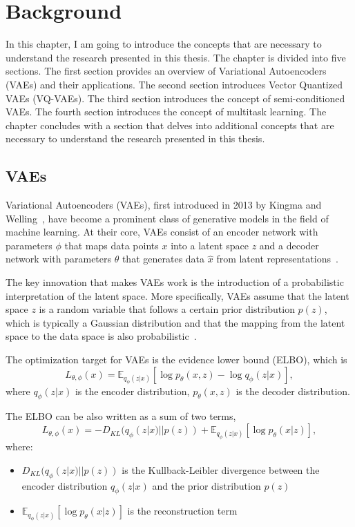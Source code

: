 \chapter{Background}

In this chapter, I am going to introduce the concepts that are necessary to understand the research presented in this thesis. The chapter is divided into five sections. The first section provides an overview of Variational Autoencoders (VAEs) and their applications. The second section introduces Vector Quantized VAEs (VQ-VAEs). The third section introduces the concept of semi-conditioned VAEs. The fourth section introduces the concept of multitask learning. The chapter concludes with a section that delves into additional concepts that are necessary to understand the research presented in this thesis.

\section{VAEs}

Variational Autoencoders (VAEs), first introduced in 2013 by Kingma and Welling~\cite{kingma2013autoencoding}, have become a prominent class of generative models in the field of machine learning.  At their core, VAEs consist of an encoder network with parameters $\phi$ that maps data points $x$ into a latent space $z$ and a decoder network with parameters $\theta$ that generates data $\hat{x}$ from latent representations~\cite{Kingma_2019}. 

The key innovation that makes VAEs work is the introduction of a probabilistic interpretation of the latent space. More specifically, VAEs assume that the latent space $z$ is a random variable that follows a certain prior distribution $p(z)$, which is typically a Gaussian distribution and that the mapping from the latent space to the data space is also probabilistic~\cite{kingma2013autoencoding}.

The optimization target for VAEs is the evidence lower bound (ELBO), which is
 \[ L_{\theta, \phi}(x) = \mathbb{E}_{q_{\phi}(z|x)} [\log p_{\theta}(x, z) - \log q_{\phi}(z|x)], \]
where $q_{\phi}(z|x)$ is the encoder distribution, $p_{\theta}(x, z)$ is the decoder distribution. 

The ELBO can be also written as a sum of two terms,
 \[ L_{\theta, \phi}(x) = - D_{KL}(q_{\phi}(z|x) || p(z)) + \mathbb{E}_{q_{\phi}(z|x)} [\log p_{\theta}(x|z)], \]
 where:

\begin{itemize}
    \item $D_{KL}(q_{\phi}(z|x) || p(z))$ is the Kullback-Leibler divergence between the encoder distribution $q_{\phi}(z|x)$ and the prior distribution $p(z)$
    \item $\mathbb{E}_{q_{\phi}(z|x)} [\log p_{\theta}(x|z)]$ is the reconstruction term
\end{itemize}

